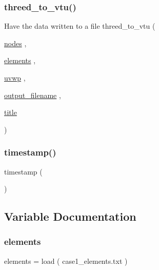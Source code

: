 \subsubsection{\texorpdfstring{threed\+\_\+to\+\_\+vtu()}{threed\_to\_vtu()}}
{\footnotesize\ttfamily Have the data written to a file threed\+\_\+to\+\_\+vtu (\begin{DoxyParamCaption}\item[{\hyperlink{a00608_a9fd973fb7dcbed4123ae5eb2f3868e61}{nodes}}]{,  }\item[{\hyperlink{a00617_aa9aaa650bacb9b91c82437c2ce48f50c}{elements}}]{,  }\item[{\hyperlink{a00617_a9c137ebda5c84e833481db1dd6531003}{uvwp}}]{,  }\item[{\hyperlink{a00617_a5934d690c688edbd92210f38fe5855e7}{output\+\_\+filename}}]{,  }\item[{\hyperlink{a00617_a051e403214cb6872ad3fe4e50302a6ee}{title}}]{ }\end{DoxyParamCaption})}

\mbox{\label{a00617_a827637c36d710b7c19476fbff9c107d2}} 
\subsubsection{\texorpdfstring{timestamp()}{timestamp()}}
{\footnotesize\ttfamily timestamp (\begin{DoxyParamCaption}{ }\end{DoxyParamCaption})}



\subsection{Variable Documentation}
\mbox{\label{a00617_aa9aaa650bacb9b91c82437c2ce48f50c}} 
\subsubsection{\texorpdfstring{elements}{elements}}
{\footnotesize\ttfamily elements = load ( \textquotesingle{}case1\+\_\+elements.\+txt\textquotesingle{} )}

